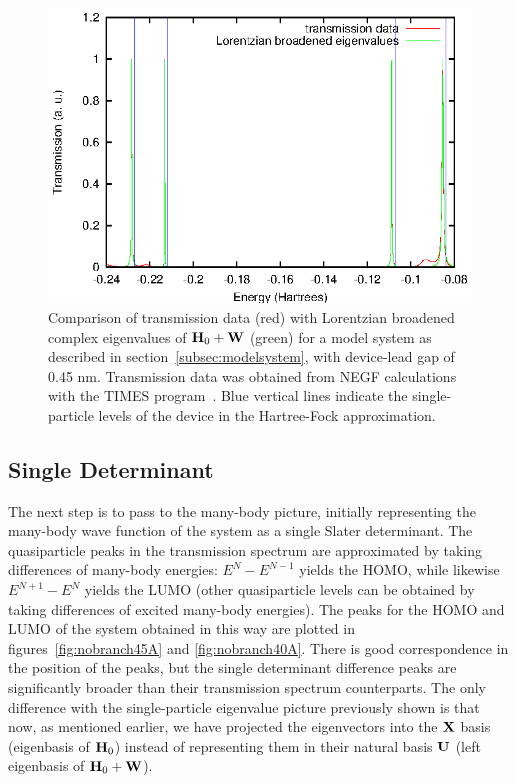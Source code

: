 \begin{figure} 
	\begin{center}
		\includegraphics[width=0.9\linewidth]{figures/4evals}
	\end{center}
	\caption{Comparison of transmission data (red) with Lorentzian
	broadened complex eigenvalues of $\mathbf{H}_0 + \mathbf{W}$ (green) for a
	model system as described in section~\ref{subsec:modelsystem}, with
	device-lead gap of 0.45 nm. Transmission data was obtained from
	\ac{NEGF} calculations with the TIMES program~\cite{times}.
        Blue vertical lines indicate the single-particle levels of the device
        in the Hartree-Fock approximation.}
	\label{fig:4evals}
\end{figure}

\subsection{Single Determinant}
\label{subsec:SingleDeterminant}

The next step is to pass to the many-body picture, initially representing the
many-body wave function of the system as a single Slater determinant. The
quasiparticle peaks in the transmission spectrum are approximated by taking
differences of many-body energies: $E^N - E^{N-1}$ yields the \ac{HOMO}, while
likewise $E^{N+1} - E^N$ yields the \ac{LUMO} (other quasiparticle levels can be
obtained by taking differences of excited many-body energies). The peaks for
the \ac{HOMO} and \ac{LUMO} of the system obtained in this way are plotted in
figures~\ref{fig:nobranch45A} and \ref{fig:nobranch40A}. There is good
correspondence in the position of the peaks, but the single determinant
difference peaks are significantly broader than their transmission spectrum
counterparts. The only difference with the single-particle eigenvalue picture
previously shown is that now, as mentioned earlier, we have projected the
eigenvectors into the $\mathbf{X}$ basis (eigenbasis of $\mathbf{H}_0$) instead of
representing them in their natural basis $\mathbf{U}$ (left eigenbasis of
$\mathbf{H}_0 + \mathbf{W}$).

